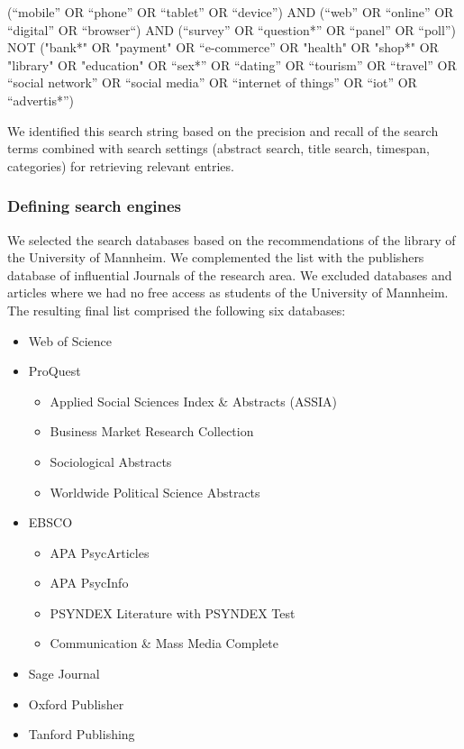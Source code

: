 \noindent (“mobile” OR “phone” OR “tablet” OR “device”) AND (“web” OR “online” OR “digital” OR “browser“) AND (“survey” OR “question*” OR “panel” OR “poll”) NOT ("bank*" OR "payment" OR “e-commerce” OR "health" OR "shop*" OR "library" OR "education" OR “sex*” OR “dating” OR “tourism” OR “travel” OR “social network” OR “social media” OR “internet of things” OR “iot” OR “advertis*”)

We identified this search string based on the precision and recall of the search terms combined with search settings (abstract search, title search, timespan, categories) for retrieving relevant entries. 


\subsubsection{Defining search engines}
\label{subsubsec: Defining search engines}

We selected the search databases based on the recommendations of the library of the University of Mannheim. We complemented the list with the publishers database of influential Journals of the research area. We excluded databases and articles where we had no free access as students of the University of Mannheim. The resulting final list comprised the following six databases:

\begin{itemize}
    \item  Web of Science
    \item ProQuest
    \begin{itemize}
        \item Applied Social Sciences Index \& Abstracts (ASSIA)
        \item Business Market Research Collection
        \item Sociological Abstracts
        \item Worldwide Political Science Abstracts
    \end{itemize}
    \item EBSCO
    \begin{itemize}
        \item APA PsycArticles
        \item APA PsycInfo
        \item PSYNDEX Literature with PSYNDEX Test
        \item Communication \& Mass Media Complete
    \end{itemize}
    \item Sage Journal
    \item Oxford Publisher
    \item Tanford Publishing
\end{itemize}


